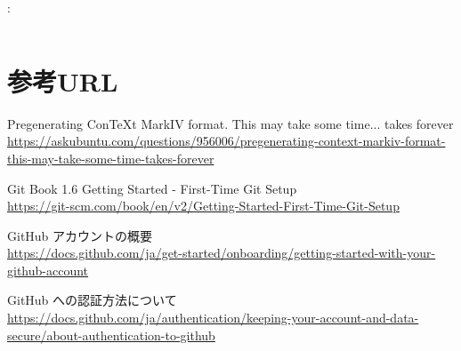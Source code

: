 \documentclass[aspectratio=169,dvipdfmx,cjk]{beamer}
\begin{document}
\begin{frame}{\insertsection \thesubsection: \insertsubsection}
\begin{columns}
\begin{column}{0.23\textwidth}
    \end{column}
  \end{columns}
\end{frame}

\section*{参考URL}
\begin{frame}{\insertsection}
  \scriptsize
  \begin{thebibliography}{99}
  \beamertemplatetextbibitems


   Pregenerating ConTeXt MarkIV format. This may take some time... takes forever\\
  \href{https://askubuntu.com/questions/956006/pregenerating-context-markiv-format-this-may-take-some-time-takes-forever
  }{https://askubuntu.com/questions/956006/pregenerating-context-markiv-format-this-may-take-some-time-takes-forever}

   Git Book 1.6 Getting Started - First-Time Git Setup\\
  \href{https://git-scm.com/book/en/v2/Getting-Started-First-Time-Git-Setup
  }{https://git-scm.com/book/en/v2/Getting-Started-First-Time-Git-Setup}

   GitHub アカウントの概要\\
  \href{https://docs.github.com/ja/get-started/onboarding/getting-started-with-your-github-account
  }{https://docs.github.com/ja/get-started/onboarding/getting-started-with-your-github-account}
  

   GitHub への認証方法について\\
  \href{https://docs.github.com/ja/authentication/keeping-your-account-and-data-secure/about-authentication-to-github
  }{https://docs.github.com/ja/authentication/keeping-your-account-and-data-secure/about-authentication-to-github}


  \end{thebibliography}
\end{frame}
\end{document}
